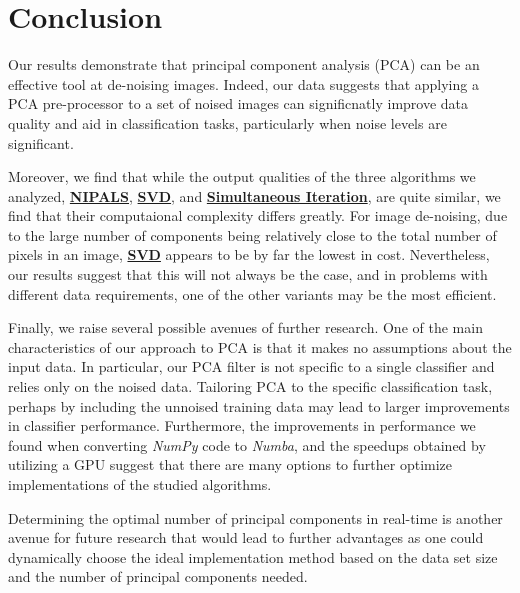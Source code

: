 \documentclass[12pt]{article}
\begin{document}
\pagebreak
\section{Conclusion}\label{7}

   Our results demonstrate that principal component analysis (PCA) can be an effective tool at de-noising images. Indeed, our data suggests that applying a PCA pre-processor to a set of noised images can significnatly improve data quality and aid in classification tasks, particularly when noise levels are significant.

    Moreover, we find that while the output qualities of the three algorithms we analyzed, \textbf{\hyperref[3.1]{NIPALS}}, \textbf{\hyperref[3.2]{SVD}}, and \textbf{\hyperref[3.3]{Simultaneous Iteration}}, are quite similar, we find that their computaional complexity differs greatly. For image de-noising, due to the large number of components being relatively close to the total number of pixels in an image, \textbf{\hyperref[3.2]{SVD}} appears to be by far the lowest in cost. Nevertheless, our results suggest that this will not always be the case, and in problems with different data requirements, one of the other variants may be the most efficient.

    Finally, we raise several possible avenues of further research. One of the main characteristics of our approach to PCA is that it makes no assumptions about the input data. In particular, our PCA filter is not specific to a single classifier and relies only on the noised data. Tailoring PCA to the specific classification task, perhaps by including the unnoised training data may lead to larger improvements in classifier performance. Furthermore, the improvements in performance we found when converting \textit{NumPy} code to \textit{Numba}, and the speedups obtained by utilizing a GPU suggest that there are many options to further optimize implementations of the studied algorithms.

    Determining the optimal number of principal components in real-time is another avenue for future research that would lead to further advantages as one could dynamically choose the ideal implementation method based on the data set size and the number of principal components needed.


\pagebreak





\end{document}
